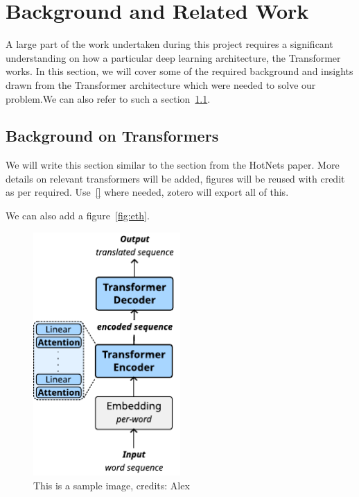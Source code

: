 \chapter{Background and Related Work}
\label{cha:background}

A large part of the work undertaken during this project requires a significant understanding on how a particular deep learning architecture, the Transformer works. In this section, we will cover some of the required background and insights drawn from the Transformer architecture which were needed to solve our problem.We can also refer to such a section~\ref{sec:background}.

\section{Background on Transformers}
\label{sec:background}


We will write this section similar to the section from the HotNets paper. More details on relevant transformers will be added, figures will be reused with credit as per required. Use~\ref{} where needed, zotero will export all of this.

We can also add a figure~\ref{fig:eth}.

\begin{figure}[!hbt]
  \begin{center}
    \includegraphics[width=0.5\textwidth]{figures/architecture_transformer.pdf}
    \caption{This is a sample image, credits: Alex}
    \label{fig:transformer}
  \end{center}
\end{figure}

